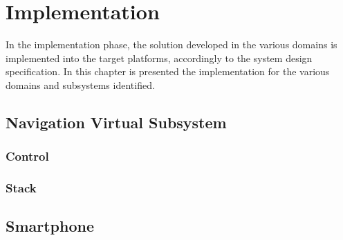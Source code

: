 \chapter{Implementation}%
\label{ch:implementation}
In the implementation phase, the solution developed in the various domains is
implemented into the target platforms, accordingly to the system design
specification. In this chapter is presented the implementation for the various domains and subsystems identified.
%
\section{Navigation Virtual Subsystem}%
\label{sec:navig-virt-subsyst-implem}
%
%
\subsection{Control}%
\label{sec:control-design}


%
\subsection{Stack}%
\label{sec:stack-implem}

%

%
\section{Smartphone}%
\label{sec:smartphone-implem}

%
